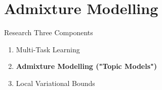 \documentclass[xcolor=dvipsnames]{beamer}
\begin{document}

\section{Admixture Modelling}

\begin{frame}{Research}
Three Components


    \begin{enumerate}
        \item { \color{gray} Multi-Task Learning }
        \item { \bf Admixture Modelling ("Topic Models")}
        \item {\color{gray} Local Variational Bounds}
    \end{enumerate}


\end{frame}

\end{document}
